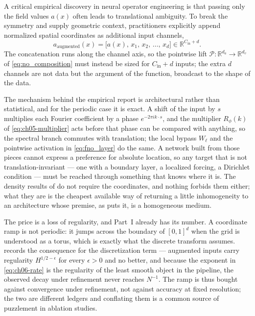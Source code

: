 A critical empirical discovery in neural operator engineering is that passing only the
field values $a(x)$ often leads to translational ambiguity. To break the symmetry and
supply geometric context, practitioners explicitly append normalized spatial coordinates
as additional input channels,
\begin{equation}
  \label{eq:ch21-augment}
  a_{\text{augmented}}(x) = \big[ a(x), \, x_1, \, x_2, \, \dots, \, x_d \big] \in \mathbb{R}^{C_{\text{in}} + d}.
\end{equation}
The concatenation runs along the channel axis, so the pointwise lift $\mathcal{P} :
\mathbb{R}^{d_a} \to \mathbb{R}^{d_v}$ of \eqref{eq:no_composition} must instead be sized
for $C_{\text{in}} + d$ inputs; the extra $d$ channels
are not data but the argument of the function, broadcast to the shape of the data.

The mechanism behind the empirical report is architectural rather than statistical, and
for the periodic case it is exact. A shift of the input by $s$ multiplies each Fourier
coefficient by a phase $e^{-2\pi i k \cdot s}$, and the multiplier $R_\phi(k)$ of
\eqref{eq:ch05-multiplier} acts before that phase can be compared with anything, so the
spectral branch commutes with translation; the local bypass $W_\ell$ and the pointwise
activation in \eqref{eq:fno_layer} do the same. A network built from those pieces
cannot express a preference for absolute location, so any target that is not
translation-invariant --- one with a boundary layer, a localized forcing, a Dirichlet
condition --- must be reached through something that knows where it is. The density results
of  do not require the
coordinates, and nothing forbids them either; what they are is the cheapest available way
of returning a little inhomogeneity to an architecture whose premise, as
 puts it, is a homogeneous
medium. 

The price is a loss of regularity, and Part~I already has its number. A coordinate ramp
is not periodic: it jumps across the boundary of $[0,1]^d$ when the grid is understood as
a torus, which is exactly what the discrete transform assumes.
 records the consequence
for the discretization term --- augmented inputs carry regularity $H^{1/2 - \epsilon}$ for
every $\epsilon > 0$ and no better, and because the exponent in \eqref{eq:ch06-rate} is
the regularity of the least smooth object in the pipeline, the observed decay under
refinement never reaches $N^{-1}$. The ramp is thus bought against convergence under
refinement, not against accuracy at fixed
resolution; the two are different ledgers and conflating them is a common source of
puzzlement in ablation studies. 

